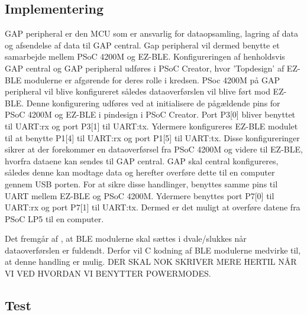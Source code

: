 \subsection{Implementering}
GAP peripheral er den MCU som er ansvarlig for dataopsamling, lagring af data og afsendelse af data til GAP central. Gap peripheral vil dermed benytte et samarbejde mellem PSoC 4200M og EZ-BLE. Konfigureringen af henholdsvis GAP central og GAP peripheral udføres i PSoC Creator, hvor ’Topdesign’ af EZ-BLE modulerne er afgørende for deres rolle i kredsen. \newline
PSoc 4200M på GAP peripheral vil blive konfigureret således dataoverførslen vil blive ført mod EZ-BLE. Denne konfigurering udføres ved at initialisere de pågældende pins for PSoC 4200M og EZ-BLE i pindesign i PSoC Creator. Port P3[0] bliver benyttet til UART:rx og port P3[1] til UART:tx. Ydermere konfigureres EZ-BLE modulet til at benytte P1[4] til UART:rx og port P1[5] til UART:tx. Disse konfigureringer sikrer at der forekommer en dataoverførsel fra PSoC 4200M og videre til EZ-BLE, hvorfra dataene kan sendes til GAP central. \citep{Semiconductor20164200M} \newline
GAP skal central konfigureres, således denne kan modtage data og herefter overføre dette til en computer gennem USB porten. For at sikre disse handlinger, benyttes samme pins til UART mellem EZ-BLE og PSoC 4200M. Ydermere benyttes port P7[0] til UART:rx og port P7[1] til UART:tx. Dermed er det muligt at overføre datene fra PSoC LP5 til en computer. 

Det fremgår af , at BLE modulerne skal sættes i dvale/slukkes når dataoverførslen er fuldendt. Derfor vil C kodning af BLE modulerne medvirke til, at denne handling er mulig. DER SKAL NOK SKRIVER MERE HERTIL NÅR VI VED HVORDAN VI BENYTTER POWERMODES.


\subsection{Test}
